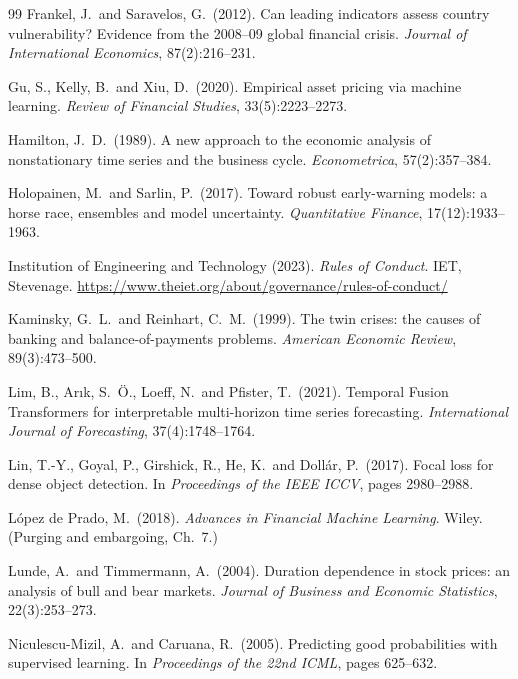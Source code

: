\documentclass[11pt,a4paper]{article}
\begin{document}
\begin{thebibliography}{99}
Frankel, J.\ and Saravelos, G.\ (2012). Can leading indicators assess country
vulnerability? Evidence from the 2008--09 global financial crisis.
\emph{Journal of International Economics}, 87(2):216--231.

Gu, S., Kelly, B.\ and Xiu, D.\ (2020). Empirical asset pricing via machine
learning. \emph{Review of Financial Studies}, 33(5):2223--2273.

Hamilton, J.\ D.\ (1989). A new approach to the economic analysis of
nonstationary time series and the business cycle. \emph{Econometrica},
57(2):357--384.

Holopainen, M.\ and Sarlin, P.\ (2017). Toward robust early-warning models: a
horse race, ensembles and model uncertainty. \emph{Quantitative Finance},
17(12):1933--1963.

Institution of Engineering and Technology (2023). \emph{Rules of Conduct}.
IET, Stevenage.
\url{https://www.theiet.org/about/governance/rules-of-conduct/}

Kaminsky, G.\ L.\ and Reinhart, C.\ M.\ (1999). The twin crises: the causes of
banking and balance-of-payments problems. \emph{American Economic Review},
89(3):473--500.

Lim, B., Ar{\i}k, S.\ \"O., Loeff, N.\ and Pfister, T.\ (2021). Temporal Fusion
Transformers for interpretable multi-horizon time series forecasting.
\emph{International Journal of Forecasting}, 37(4):1748--1764.

Lin, T.-Y., Goyal, P., Girshick, R., He, K.\ and Doll\'ar, P.\ (2017). Focal
loss for dense object detection. In \emph{Proceedings of the IEEE ICCV},
pages 2980--2988.

L\'opez de Prado, M.\ (2018). \emph{Advances in Financial Machine Learning}.
Wiley. (Purging and embargoing, Ch.\ 7.)

Lunde, A.\ and Timmermann, A.\ (2004). Duration dependence in stock prices: an
analysis of bull and bear markets. \emph{Journal of Business and Economic
Statistics}, 22(3):253--273.

Niculescu-Mizil, A.\ and Caruana, R.\ (2005). Predicting good probabilities
with supervised learning. In \emph{Proceedings of the 22nd ICML}, pages
625--632.


\end{thebibliography}
\end{document}
